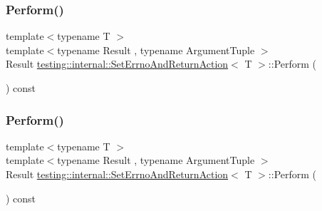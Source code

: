 \mbox{\label{classtesting_1_1internal_1_1_set_errno_and_return_action_a44025d0d124cab72878bf6bdb12c3693}} 
\subsubsection{\texorpdfstring{Perform()}{Perform()}\hspace{0.1cm}{\footnotesize\ttfamily [2/3]}}
{\footnotesize\ttfamily template$<$typename T $>$ \\
template$<$typename Result , typename Argument\+Tuple $>$ \\
Result \mbox{\hyperlink{classtesting_1_1internal_1_1_set_errno_and_return_action}{testing\+::internal\+::\+Set\+Errno\+And\+Return\+Action}}$<$ T $>$\+::Perform (\begin{DoxyParamCaption}\item[{const Argument\+Tuple \&}]{ }\end{DoxyParamCaption}) const\hspace{0.3cm}{\ttfamily [inline]}}

\mbox{\label{classtesting_1_1internal_1_1_set_errno_and_return_action_a44025d0d124cab72878bf6bdb12c3693}} 
\subsubsection{\texorpdfstring{Perform()}{Perform()}\hspace{0.1cm}{\footnotesize\ttfamily [3/3]}}
{\footnotesize\ttfamily template$<$typename T $>$ \\
template$<$typename Result , typename Argument\+Tuple $>$ \\
Result \mbox{\hyperlink{classtesting_1_1internal_1_1_set_errno_and_return_action}{testing\+::internal\+::\+Set\+Errno\+And\+Return\+Action}}$<$ T $>$\+::Perform (\begin{DoxyParamCaption}\item[{const Argument\+Tuple \&}]{ }\end{DoxyParamCaption}) const\hspace{0.3cm}{\ttfamily [inline]}}




